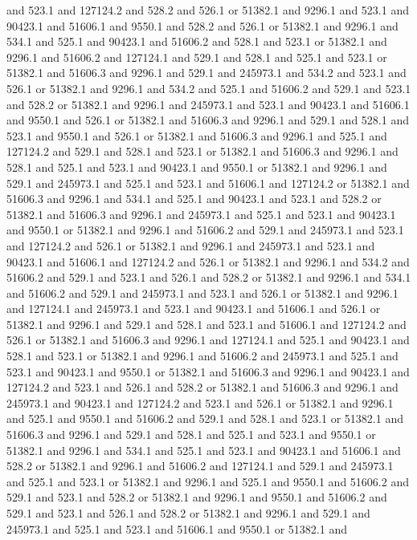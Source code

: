 and 523.1 and 127124.2 and 528.2 and 526.1 or 51382.1 and 9296.1 and
523.1 and 90423.1 and 51606.1 and 9550.1 and 528.2 and 526.1 or
51382.1 and 9296.1 and 534.1 and 525.1 and 90423.1 and 51606.2 and
528.1 and 523.1 or 51382.1 and 9296.1 and 51606.2 and 127124.1 and
529.1 and 528.1 and 525.1 and 523.1 or 51382.1 and 51606.3 and 9296.1
and 529.1 and 245973.1 and 534.2 and 523.1 and 526.1 or 51382.1 and
9296.1 and 534.2 and 525.1 and 51606.2 and 529.1 and 523.1 and 528.2
or 51382.1 and 9296.1 and 245973.1 and 523.1 and 90423.1 and 51606.1
and 9550.1 and 526.1 or 51382.1 and 51606.3 and 9296.1 and 529.1 and
528.1 and 523.1 and 9550.1 and 526.1 or 51382.1 and 51606.3 and 9296.1
and 525.1 and 127124.2 and 529.1 and 528.1 and 523.1 or 51382.1 and
51606.3 and 9296.1 and 528.1 and 525.1 and 523.1 and 90423.1 and
9550.1 or 51382.1 and 9296.1 and 529.1 and 245973.1 and 525.1 and
523.1 and 51606.1 and 127124.2 or 51382.1 and 51606.3 and 9296.1 and
534.1 and 525.1 and 90423.1 and 523.1 and 528.2 or 51382.1 and 51606.3
and 9296.1 and 245973.1 and 525.1 and 523.1 and 90423.1 and 9550.1 or
51382.1 and 9296.1 and 51606.2 and 529.1 and 245973.1 and 523.1 and
127124.2 and 526.1 or 51382.1 and 9296.1 and 245973.1 and 523.1 and
90423.1 and 51606.1 and 127124.2 and 526.1 or 51382.1 and 9296.1 and
534.2 and 51606.2 and 529.1 and 523.1 and 526.1 and 528.2 or 51382.1
and 9296.1 and 534.1 and 51606.2 and 529.1 and 245973.1 and 523.1 and
526.1 or 51382.1 and 9296.1 and 127124.1 and 245973.1 and 523.1 and
90423.1 and 51606.1 and 526.1 or 51382.1 and 9296.1 and 529.1 and
528.1 and 523.1 and 51606.1 and 127124.2 and 526.1 or 51382.1 and
51606.3 and 9296.1 and 127124.1 and 525.1 and 90423.1 and 528.1 and
523.1 or 51382.1 and 9296.1 and 51606.2 and 245973.1 and 525.1 and
523.1 and 90423.1 and 9550.1 or 51382.1 and 51606.3 and 9296.1 and
90423.1 and 127124.2 and 523.1 and 526.1 and 528.2 or 51382.1 and
51606.3 and 9296.1 and 245973.1 and 90423.1 and 127124.2 and 523.1 and
526.1 or 51382.1 and 9296.1 and 525.1 and 9550.1 and 51606.2 and 529.1
and 528.1 and 523.1 or 51382.1 and 51606.3 and 9296.1 and 529.1 and
528.1 and 525.1 and 523.1 and 9550.1 or 51382.1 and 9296.1 and 534.1
and 525.1 and 523.1 and 90423.1 and 51606.1 and 528.2 or 51382.1 and
9296.1 and 51606.2 and 127124.1 and 529.1 and 245973.1 and 525.1 and
523.1 or 51382.1 and 9296.1 and 525.1 and 9550.1 and 51606.2 and 529.1
and 523.1 and 528.2 or 51382.1 and 9296.1 and 9550.1 and 51606.2 and
529.1 and 523.1 and 526.1 and 528.2 or 51382.1 and 9296.1 and 529.1
and 245973.1 and 525.1 and 523.1 and 51606.1 and 9550.1 or 51382.1 and
